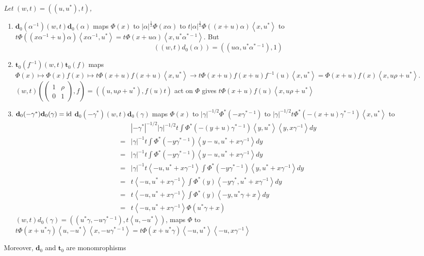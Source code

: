 \documentclass[12pt]{amsart}
\newenvironment{expl}{\it}{\color{black}\normalsize}
\def\bd{{\mathbf{d}}}
\def\bt{{\mathbf{t}}}
\def\id{{\rm id}}
\def\inn#1#2{\left\langle{#1},{#2}\right\rangle}
\def\abs#1{\left|{#1}\right|}
\begin{document}
\begin{expl}
Let $(w,t) = ((u,u^*),t)$,
\begin{enumerate}[(1)]
\item
$\bd_0(\alpha^{-1})(w,t)\bd_0(\alpha)$
maps $\Phi(x)$ to $\abs{\alpha}^{\frac{1}{2}}\Phi(x\alpha)$
to $t \abs{\alpha}^{\frac{1}{2}}\Phi((x+u)\alpha)\inn{x}{u^*}$
to $t\Phi((x\alpha^{-1}+u)\alpha)\inn{x\alpha^{-1}}{u^*}
=t\Phi(x+u\alpha)\inn{x}{u^*\alpha^{*-1}}$.
But 
\[
((w,t)d_0(\alpha)) = ((u\alpha, u^*\alpha^{*-1}),1)
\]
\item
$\bt_0(f^{-1})(w,t)\bt_0(f)$
maps $\Phi(x) \mapsto \Phi(x)f(x) \mapsto
t\Phi(x+u)f(x+u)\inn{x}{u^*} \to t \Phi(x+u) f(x+u) f^{-1}(u)\inn{x}{u^*}
 = \Phi(x+u) f(x)\inn{x}{u\rho+u^*} $.\\
$(w,t)\left(\begin{pmatrix}1& \rho \\ 0 & 1\end{pmatrix},f\right) 
= ((u,u\rho +u^*),f(u)t)$ act on $\Phi$ gives $t\Phi(x+u)f(u)\inn{x}{u\rho+u^*}$
\item 
$\bd_0(-\gamma^*) \bd_0(\gamma) = \id$
$\bd_0(-\gamma^*)(w,t)\bd_0(\gamma)$ maps $\Phi(x)$ 
to $\abs{\gamma}^{-1/2}\Phi^*(-x\gamma^{*-1})$
to  $\abs{\gamma}^{-1/2}t\Phi^*(-(x+u)\gamma^{*-1})\inn{x}{u^*}$
to  
\[
\begin{split}
&\abs{-\gamma^*}^{-1/2}\abs{\gamma}^{-1/2}t
\int \Phi^*(-(y+u)\gamma^{*-1})\inn{y}{u^*}\inn{y}{x\gamma^{-1}}dy\\
=& \abs{\gamma}^{-1} t
\int \Phi^*(-y\gamma^{*-1})\inn{y-u}{u^*+x\gamma^{-1}}dy\\
=& \abs{\gamma}^{-1} t
\int \Phi^*(-y\gamma^{*-1})\inn{y-u}{u^*+x\gamma^{-1}}dy\\
=& \abs{\gamma}^{-1} t \inn{-u}{u^*+x\gamma^{-1}}
\int \Phi^*(-y\gamma^{*-1})\inn{y}{u^*+x\gamma^{-1}}dy\\
=&  t \inn{-u}{u^*+x\gamma^{-1}}
\int \Phi^*(y)\inn{-y\gamma^*}{u^*+x\gamma^{-1}}dy\\
=&  t \inn{-u}{u^*+x\gamma^{-1}}
\int \Phi^*(y)\inn{-y}{u^*\gamma+x}dy\\
=& t \inn{-u}{u^*+x\gamma^{-1}}\Phi(u^*\gamma+x)
\end{split}
\]
$(w,t)d_0(\gamma) = ((u^*\gamma, -u\gamma^{*-1}),t\inn{u}{-u^*})$,
maps $\Phi$ to $t\Phi(x+u^*\gamma)\inn{u}{-u^*}\inn{x}{-u\gamma^{*-1}}
=t\Phi(x+u^*\gamma)\inn{-u}{u^*}\inn{-u}{x\gamma^{-1}}$
\end{enumerate}
\end{expl}
Moreover, $\bd_0$ and $\bt_0$ are monomrophisms
\end{document}
